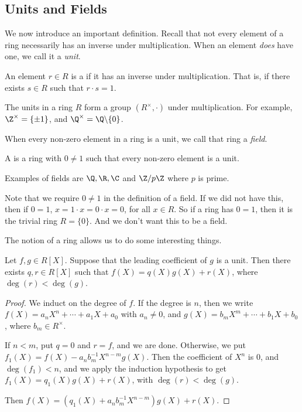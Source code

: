\subsection{Units and Fields}

We now introduce an important definition. Recall that not every element of a ring necessarily has an inverse under multiplication. When an element \emph{does} have one, we call it a \emph{unit}.

\begin{definition}[Unit]
	An element $r \in R$ is a  if it has an inverse under multiplication. That is, if there exists $s \in R$ such that $r\cdot s = 1$.
\end{definition}

The units in a ring $R$ form a group $(R^\times, \cdot)$ under multiplication. For example, $\Z^\times = \{\pm 1\}$, and $\Q^\times = \Q \backslash \{0\}$.

When every non-zero element in a ring is a unit, we call that ring a \emph{field}.

\begin{definition}[Field]
	A  is a ring with $0 \neq 1$ such that every non-zero element is a unit.
\end{definition}

Examples of fields are $\Q, \R, \C$ and $\Z/p\Z$ where $p$ is prime.

\begin{remark}
	Note that we require $0 \neq 1$ in the definition of a field. If we did not have this, then if $0 = 1$, $x = 1 \cdot x = 0 \cdot x = 0$, for all $x \in R$. So if a ring has $0 = 1$, then it is the trivial ring $R = \{0\}$. And we don't want this to be a field.
\end{remark}

The notion of a ring allows us to do some interesting things.

\begin{lemma}
	Let $f, g \in R[X]$. Suppose that the leading coefficient of $g$ is a unit. Then there exists $q, r \in R[X]$ such that $f(X) = q(X) g(X) + r(X)$, where $\deg(r) < \deg(g)$.
\end{lemma}
\begin{proof}
	We induct on the degree of $f$. If the degree is $n$, then we write $f(X) = a_n X^n + \cdots + a_1 X + a_0$ with $a_n \neq 0$, and $g(X) = b_m X^m + \cdots + b_1  X + b_0$, where $b_m \in R^\times$.

	If $n < m$, put $q = 0$ and $r = f$, and we are done. Otherwise, we put $f_1(X) = f(X) - a_n b_m^{-1}X^{n - m}g(X)$. Then the coefficient of $X^n$ is $0$, and $\deg(f_1) < n$, and we apply the induction hypothesis to get $f_1(X) = q_1(X)g(X) + r(X)$, with $\deg(r) < \deg(g)$.

	Then $f(X) =(q_1(X) + a_n b_{m}^{-1} X^{n - m})g(X) + r(X)$.
\end{proof}

